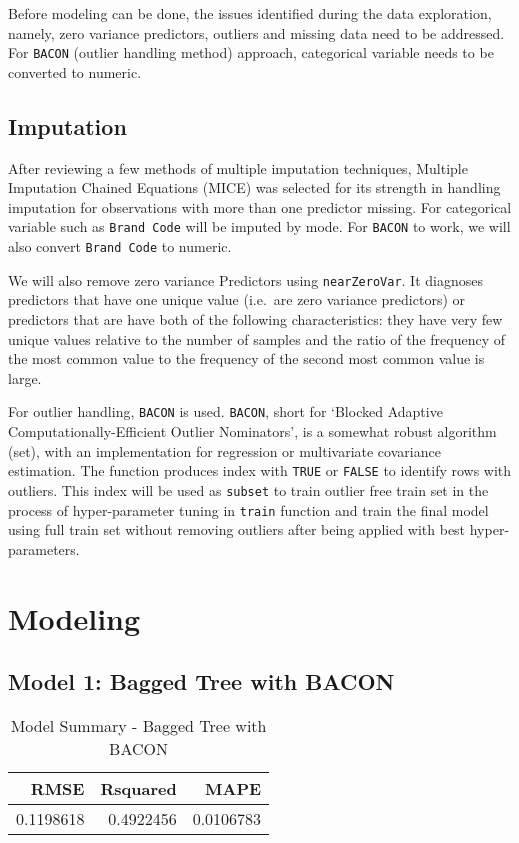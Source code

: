 \documentclass[]{report}
\begin{document}
Before modeling can be done, the issues identified during the data
exploration, namely, zero variance predictors, outliers and missing data
need to be addressed. For \texttt{BACON} (outlier handling method)
approach, categorical variable needs to be converted to numeric.

\section{Imputation}\label{imputation}

After reviewing a few methods of multiple imputation techniques,
Multiple Imputation Chained Equations (MICE) was selected for its
strength in handling imputation for observations with more than one
predictor missing. For categorical variable such as \texttt{Brand\ Code}
will be imputed by mode. For \texttt{BACON} to work, we will also
convert \texttt{Brand\ Code} to numeric.

We will also remove zero variance Predictors using \texttt{nearZeroVar}.
It diagnoses predictors that have one unique value (i.e.~are zero
variance predictors) or predictors that are have both of the following
characteristics: they have very few unique values relative to the number
of samples and the ratio of the frequency of the most common value to
the frequency of the second most common value is large.

For outlier handling, \texttt{BACON} is used. \texttt{BACON}, short for
`Blocked Adaptive Computationally-Efficient Outlier Nominators', is a
somewhat robust algorithm (set), with an implementation for regression
or multivariate covariance estimation. The function produces index with
\texttt{TRUE} or \texttt{FALSE} to identify rows with outliers. This
index will be used as \texttt{subset} to train outlier free train set in
the process of hyper-parameter tuning in \texttt{train} function and
train the final model using full train set without removing outliers
after being applied with best hyper-parameters.

\chapter{Modeling}\label{modeling}

\section{Model 1: Bagged Tree with
BACON}\label{model-1-bagged-tree-with-bacon}

\begin{table}[H]

\caption{\label{tab:unnamed-chunk-12}Model Summary - Bagged Tree with BACON}
\centering
\fontsize{8}{10}\selectfont
\begin{tabular}[t]{rrr}
\toprule
\textbf{RMSE} & \textbf{Rsquared} & \textbf{MAPE}\\
\midrule
\rowcolor{gray!6}  0.1198618 & 0.4922456 & 0.0106783\\
\bottomrule
\end{tabular}
\end{table}
\end{document}
